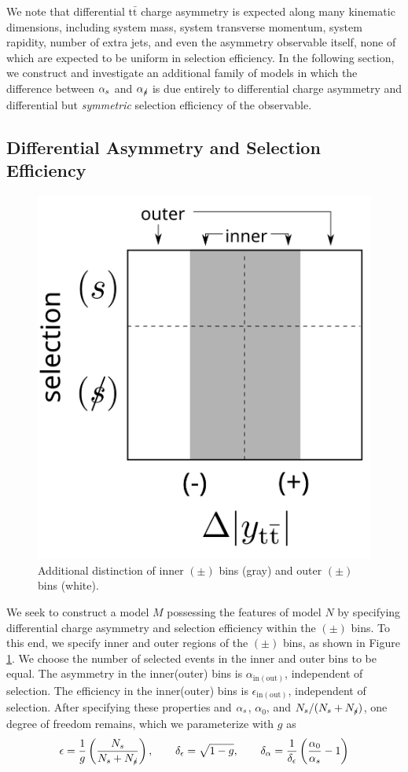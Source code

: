 \documentclass[letterpaper,11pt]{article}
\newcommand{\selected}{{\ensuremath s}}
\newcommand{\unselected}{{\ensuremath\slash\!\!\!\selected}}
\newcommand{\tot}{0}
\begin{document}
We note that differential $\mathrm{t\bar{t}}$ charge asymmetry is
expected along many kinematic dimensions, including system mass,
system transverse momentum, system rapidity, number of extra jets, and
even the asymmetry observable itself, none of which are expected to be
uniform in selection efficiency.  In the following section, we
construct and investigate an additional family of models in which the
difference between $\alpha_\selected$ and $\alpha_\unselected$ is due
entirely to differential charge asymmetry and differential but
\emph{symmetric} selection efficiency of the observable.

\subsection{Differential Asymmetry and Selection Efficiency}
\newcommand{\outr}{\mathrm{out}}
\newcommand{\innr}{\mathrm{in}}
\newcommand{\dalpha}{{\delta_{\alpha}}}
\newcommand{\depsilon}{{\delta_{\epsilon}}}
\begin{figure}
  \centering
  \includegraphics[width=0.4\linewidth]{axes2}
  \caption{\label{axes2} Additional distinction of inner $(\pm)$ bins
    (gray) and outer $(\pm)$ bins (white).}
\end{figure}
We seek to construct a model $M$ possessing the features of model $N$
by specifying differential charge asymmetry and selection efficiency
within the $(\pm)$ bins.  To this end, we specify inner and outer
regions of the $(\pm)$ bins, as shown in Figure \ref{axes2}.  We
choose the number of selected events in the inner and outer bins to be
equal.  The asymmetry in the inner(outer) bins is
$\alpha_{\innr(\outr)}$, independent of selection.  The efficiency in
the inner(outer) bins is $\epsilon_{\innr(\outr)}$, independent of
selection.  After specifying these properties and $\alpha_\selected$,
$\alpha_\tot$, and $N_\selected/(N_\selected+N_\unselected)$, one
degree of freedom remains, which we parameterize with $g$ as
\[\epsilon = \frac{1}{g}\left(\frac{N_\selected}{N_\selected+N_\unselected}\right),\qquad \depsilon=\sqrt{1-g},\qquad\dalpha = \frac{1}{\depsilon}\left(\frac{\alpha_\tot}{\alpha_\selected}-1\right)\]
\end{document}
